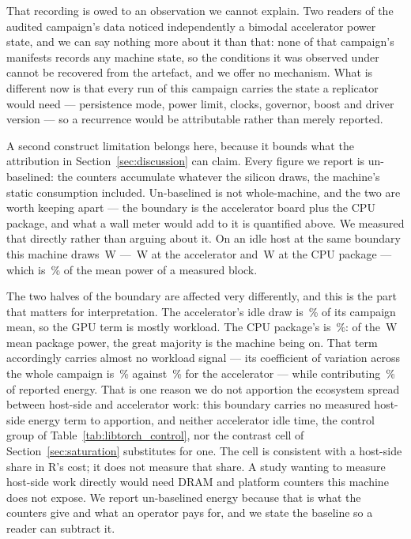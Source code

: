 That recording is owed to an observation we cannot explain. Two readers of the
audited campaign's data noticed independently a bimodal accelerator power
state, and we can say nothing more about it than that: none of
that campaign's manifests records any machine state, so the conditions it was
observed under cannot be recovered from the artefact, and we offer no mechanism.
What is different now is that every run of this campaign carries the state a
replicator would need --- persistence mode, power limit, clocks, governor, boost
and driver version --- so a recurrence would be attributable rather than merely
reported.

A second construct limitation belongs here, because it bounds what the
attribution in Section~\ref{sec:discussion} can claim. Every figure we report is
un-baselined: the counters accumulate whatever the silicon draws, the machine's
static consumption included. Un-baselined is not whole-machine, and the two are
worth keeping apart --- the boundary is the accelerator board plus the CPU
package, and what a wall meter would add to it is quantified above. We measured that directly
rather than arguing about it. On an idle host at the same boundary this machine
draws \vIdleTotalW\,\si{\watt} --- \vIdleGpuW\,\si{\watt} at the accelerator and
\vIdleCpuW\,\si{\watt} at the CPU package --- which is
\vIdleShareOfBlockPct\,\% of the mean power of a measured block.

The two halves of the boundary are affected very differently, and this is the
part that matters for interpretation. The accelerator's idle draw is
\vIdleGpuSharePct\,\% of its campaign mean, so the GPU term is mostly workload.
The CPU package's is \vIdleCpuSharePct\,\%: of the \vCpuPowerMeanW\,\si{\watt}
mean package power, the great majority is the machine being on. That term
accordingly carries almost no workload signal --- its coefficient of variation
across the whole campaign is \vCpuPowerCVPct\,\% against \vGpuPowerCVPct\,\% for
the accelerator --- while contributing \vCpuShareOfTotalPct\,\% of reported
energy. That is one reason we do not apportion the ecosystem spread between
host-side and accelerator work: this boundary carries no measured host-side
energy term to apportion, and neither accelerator idle time, the control group of
Table~\ref{tab:libtorch_control}, nor the contrast cell of
Section~\ref{sec:saturation} substitutes for one. The cell is consistent with a
host-side share in R's cost; it does not measure that share. A study wanting to measure host-side
work directly would need DRAM and platform counters this machine does not
expose. We report un-baselined energy because that is what the counters give
and what an operator pays for, and we state the baseline so a reader can
subtract it.


